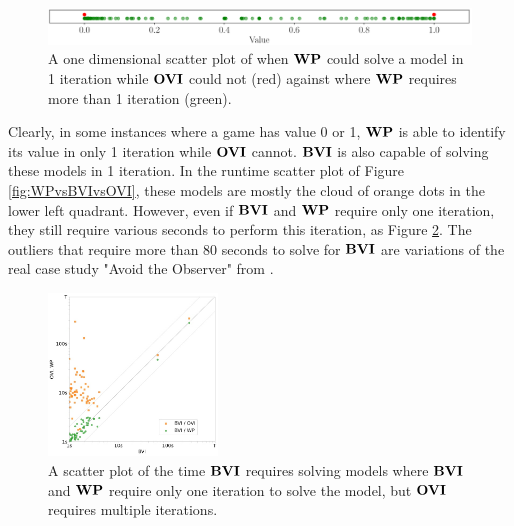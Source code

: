 \begin{figure}[h!]
    \centering
    \includegraphics[width=1\textwidth]{figures/OVI_Bad_At_Computing_Instant_Values.png}
    \caption[$\OVI$ cannot instantly compute models]{
        A one dimensional scatter plot of when $\mathbf{WP}$ could solve a model in 1 iteration while $\OVI$ could not (red) 
        against where $\mathbf{WP}$ requires more than 1 iteration (green).
    }
    \label{fig:OVIinstantCompute}
\end{figure}
\FloatBarrier

Clearly, in some instances where a game has value 0 or 1, $\mathbf{WP}$ is able to identify its value in only 1 iteration while $\OVI$ cannot.
$\BVI$ is also capable of solving these models in 1 iteration.
In the runtime scatter plot of Figure \ref{fig:WPvsBVIvsOVI}, these models are mostly the cloud of orange dots in the lower left quadrant.
However, even if $\BVI$ and $\mathbf{WP}$ require only one iteration, they still require various seconds to perform this iteration, as Figure \ref{fig:BVI1IterationTime}.
The outliers that require more than 80 seconds to solve for $\BVI$ are variations of the real case study "Avoid the Observer" from \cite{cav20}.
\begin{figure}[h!]
    \centering
    \includegraphics[width=0.4\textwidth]{figures/BVI_1_Iteration_vs_OVI.jpg}
    \caption[Time $\BVI$ requires solving models where it only needs one iteration]{
        A scatter plot of the time $\BVI$ requires solving models where $\BVI$ and $\mathbf{WP}$ require only one iteration to solve the model, 
        but $\OVI$ requires multiple iterations. 
    }
    \label{fig:BVI1IterationTime}
\end{figure}
\FloatBarrier

